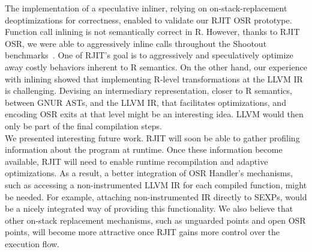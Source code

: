 The implementation of a speculative inliner, relying on on-stack-replacement deoptimizations for correctness, enabled to validate our RJIT OSR prototype. 
Function call inlining is not semantically correct in R.
However, thanks to RJIT OSR, we were able to aggressively inline calls throughout the Shootout benchmarks~\cite{Shootout}.
One of RJIT's goal is to aggressively and speculatively optimize away costly behaviors inherent to R semantics.
On the other hand, our experience with inlining showed that implementing R-level transformations at the LLVM IR is challenging.
Devising an intermediary representation, closer to R semantics, between GNUR ASTs, and the LLVM IR, that facilitates optimizations, and encoding OSR exits at that level might be an interesting idea.
LLVM would then only be part of the final compilation steps.\\

We presented interesting future work.
RJIT will soon be able to gather profiling information about the program at runtime. 
Once these information become available, RJIT will need to enable runtime recompilation and adaptive optimizations.
As a result, a better integration of OSR Handler's mechanisms, such as accessing a non-instrumented LLVM IR for each compiled function, might be needed. 
For example, attaching non-instrumented IR directly to SEXPs, would be a nicely integrated way of providing this functionality.
We also believe that other on-stack replacement mechanisms, such as unguarded points and open OSR points, will become more attractive once RJIT gains more control over the execution flow.\\